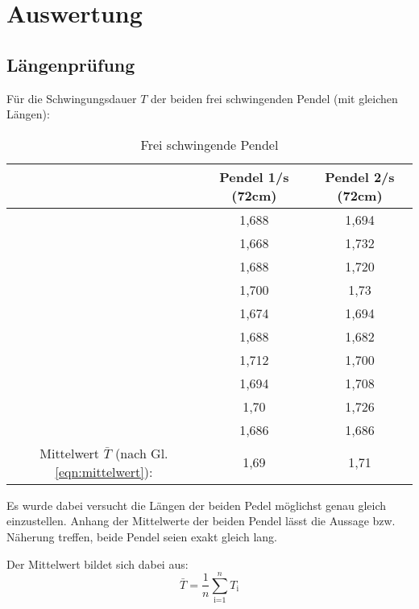 \newpage
\section{Auswertung}
\label{sec:Auswertung}
\subsection{Längenprüfung}
Für die Schwingungsdauer $T$ der beiden frei schwingenden Pendel (mit gleichen Längen):

\begin{table}
    \centering
    \label{tab:Data_freischwingend}
    \begin{tabular}{c c | c}
        \toprule
         & Pendel 1\;/\;s (72cm) & Pendel 2\;/\;s (72cm)\\
        \midrule
        & 1,688 & 1,694 \\
        & 1,668 & 1,732 \\
        & 1,688 & 1,720  \\
        & 1,700  & 1,73  \\
        & 1,674 & 1,694 \\
        & 1,688 & 1,682 \\
        & 1,712 & 1,700   \\
        & 1,694 & 1,708 \\
        & 1,70  & 1,726 \\
        & 1,686 & 1,686 \\
        \midrule
        Mittelwert $\bar{T}$ (nach Gl. \ref{eqn:mittelwert}): & 1,69 & 1,71 \\
        \bottomrule
    \end{tabular} 
    \caption{Frei schwingende Pendel}
\end{table}

Es wurde dabei versucht die Längen der beiden Pedel möglichst genau gleich einzustellen.
Anhang der Mittelwerte der beiden Pendel lässt die Aussage bzw. Näherung treffen, beide Pendel seien exakt gleich lang.

Der Mittelwert bildet sich dabei aus:
\begin{equation}
    \bar{T}=\frac{1}{n}\sum_{\textrm{i=1}}^n T_\textrm{i}
    \label{eqn:mittelwert}
\end{equation}
\newpage
